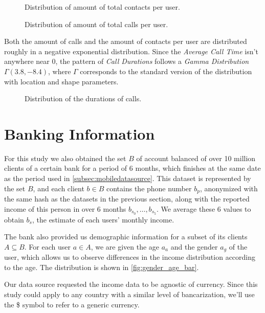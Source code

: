 \begin{figure}
\centering
{}
\caption{Distribution of amount of total contacts per user.}
\label{fig:outcalls_dist}
\end{figure}

\begin{figure}
\centering
{}
\caption{Distribution of amount of total calls per user.}
\label{fig:outcontacts_dist}
\end{figure}

Both the amount of calls and the amount of contacts per user are distributed roughly in a negative exponential distribution. Since the \emph{Average Call Time} isn't anywhere near 0, the pattern of \emph{Call Durations} follows a \emph{Gamma Distribution} $\Gamma \left( 3.8, -8.4 \right)$, where $\Gamma$ corresponds to the standard version of the distribution with location and shape parameters.

\begin{figure}
\centering
{}
\caption{Distribution of the durations of calls.}
\label{fig:callduration}
\end{figure}

\section{Banking Information}
\label{subsec:bank_source}

For this study we also obtained the set $B$ of account balanced of over 10 million clients of a certain bank for a period of 6 months, which finishes at the same date as the period used in \cref{subsec:mobiledatasource}. This dataset is represented by the set $B$, and each client $b \in B$ contains the phone number $b_p$, anonymized with the same hash as the datasets in the previous section, along with the reported income of this person in over 6 months $b_{s_0}, \ldots, b_{s_5}$. We average these 6 values to obtain $b_s$, the estimate of each users' monthly income.

The bank also provided us demographic information for a subset of its clients $A \subseteq B$. For each user $a \in A$, we are given the age $a_a$ and the gender $a_g$ of the user, which allows us to observe differences in the income distribution according to the age. The distribution is shown in \cref{fig:gender_age_bar}.

Our data source requested the income data to be agnostic of currency. Since this study could apply to any country with a similar level of bancarization, we'll use the \$ symbol to refer to a generic currency.

